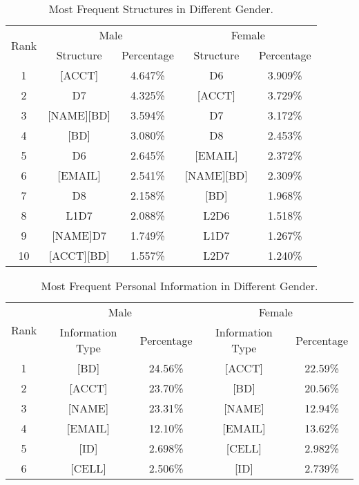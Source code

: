 \begin{table}
\centering
\caption{Most Frequent Structures in Different Gender.}
\begin{adjustbox}{max width=0.48\textwidth}
\begin{tabular}{|c|c|c|c|c|} \hline
\multirow{2}{*}{Rank}&\multicolumn{2}{|c|}{Male}&\multicolumn{2}{|c|}{Female}\\ \cline{2-5}
&Structure&Percentage&Structure&Percentage\\ \hline
1&[ACCT] & 4.647\%&D6 & 3.909\%\\
2&D7 & 4.325\%&[ACCT] & 3.729\%\\
3&[NAME][BD] & 3.594\%&D7 & 3.172\%\\
4&[BD] & 3.080\%&D8 & 2.453\%\\
5&D6 & 2.645\%&[EMAIL] & 2.372\%\\
6&[EMAIL] & 2.541\%&[NAME][BD] & 2.309\%\\
7&D8 & 2.158\%&[BD] & 1.968\%\\
8&L1D7 & 2.088\%&L2D6 & 1.518\%\\
9&[NAME]D7 & 1.749\%&L1D7 & 1.267\%\\
10&[ACCT][BD] & 1.557\%&L2D7 & 1.240\%\\
\hline\end{tabular}
\end{adjustbox}
\label{t5}
\end{table}

\begin{table}
\centering
\caption{Most Frequent Personal Information in Different Gender.}
\begin{adjustbox}{max width=0.48\textwidth}
\begin{tabular}{|c|c|c|c|c|} \hline
\multirow{2}{*}{Rank}&\multicolumn{2}{|c|}{Male}&\multicolumn{2}{|c|}{Female}\\ \cline{2-5}
&Information Type&Percentage&Information Type&Percentage\\ \hline
1&[BD]&24.56\%&[ACCT]&22.59\%\\
2&[ACCT]&23.70\%&[BD]&20.56\%\\
3&[NAME]&23.31\%&[NAME]&12.94\%\\
4&[EMAIL]&12.10\%&[EMAIL]&13.62\%\\
5&[ID]&2.698\%&[CELL]&2.982\%\\
6&[CELL]&2.506\%&[ID]&2.739\%\\
\hline\end{tabular}
\end{adjustbox}
\label{t6}
\end{table}

